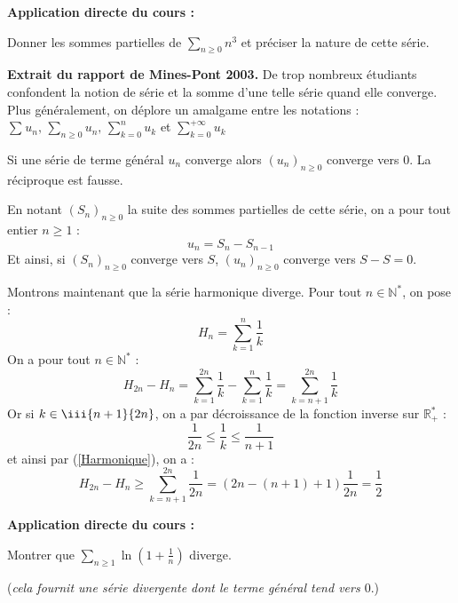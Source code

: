 \documentclass[french,11pt,twoside]{VcCours}
\newenvironment{ApplicationDirecte}{\textbf{Application directe du cours :}

}{}
\newcommand{\Sum}[2]{\ensuremath{\textstyle{\sum\limits_{#1}^{#2}}}}
\begin{document}
\begin{ApplicationDirecte} Donner les sommes partielles de $\Sum{n \geq 0}{} n^3$ et préciser la nature de cette série.
\end{ApplicationDirecte} 

\textbf{Extrait du rapport de Mines-Pont 2003.} \og De trop nombreux étudiants confondent la notion de série et la somme d'une telle série quand elle converge.  Plus généralement, on déplore un amalgame entre les notations : $\Sum{}{} u_n, \,  \Sum{n \geq 0}{} u_n,  \, \Sum{k = 0}{n} u_k$ et $\Sum{k =0}{+ \infty} u_k$ \fg 

\medskip


\begin{Theoreme}{} Si une série de terme général $u_n$ converge alors $(u_n)_{n \geq 0}$ converge vers $0$. La réciproque est fausse. \end{Theoreme}

\begin{Demonstration}{} 


En notant $(S_n)_{n \geq 0}$ la suite des sommes partielles de cette série, on a pour tout entier $n \geq 1$ :
$$ u_n = S_{n}-S_{n-1}$$
Et ainsi, si $(S_n)_{n \geq 0}$ converge vers $S$, $(u_n)_{n \geq 0}$ converge vers $S-S=0$.

\bigskip

Montrons maintenant que la série harmonique diverge. Pour tout $n \in \mathbb{N}^*$, on pose :
$$ H_n = \sum_{k=1}^n \frac{1}{k}$$
On a pour tout $n \in \mathbb{N}^*$ :
\begin{equation}\label{Harmonique}
H_{2n}-H_n =  \sum_{k=1}^{2n} \frac{1}{k} -  \sum_{k=1}^n \frac{1}{k} =  \sum_{k=n+1}^{2n} \frac{1}{k}
\end{equation}
Or si $k \in \iii{n+1}{2n}$, on a par décroissance de la fonction inverse sur $\mathbb{R}_+^{*}$ :
$$ \frac{1}{2n} \leq \frac{1}{k} \leq \frac{1}{n+1} $$
et ainsi par (\ref{Harmonique}), on a :
\begin{equation}\label{Harmonique2} H_{2n}-H_n \geq  \sum_{k=n+1}^{2n} \frac{1}{2n} = (2n-(n+1)+1) \frac{1}{2n} = \frac{1}{2}
\end{equation}
\end{Demonstration}

\begin{ApplicationDirecte} Montrer que $\Sum{n\geq 1}{} \ln \left(1 + \frac{1}{n} \right)$ diverge.
	
	(\emph{cela fournit une série divergente dont le terme général tend vers $0$}.)
\end{ApplicationDirecte}
\end{document}
